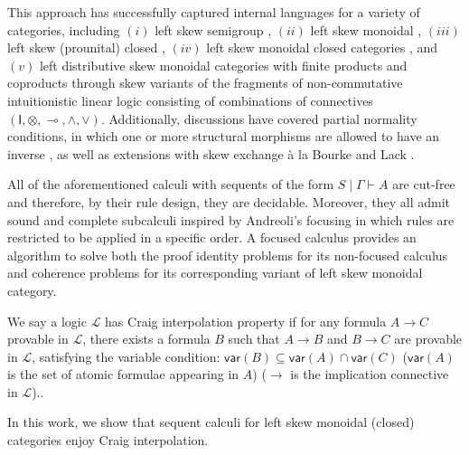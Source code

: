\documentclass[sn-mathphys-num]{sn-jnl}%
\newcommand{\GG}{\Gamma}
\newcommand{\GT}{\Theta}
\newcommand{\vd}{\vdash}
\newcommand{\ot}{\otimes}
\newcommand{\lolli}{\multimap}
\newcommand{\I}{\mathsf{I}}
\newcommand{\mc}[1]{\mathcal{#1}}
\newcommand{\vars}[1]{\mathsf{var}(#1)}
\theoremstyle{thmstyleone}%
\theoremstyle{thmstyletwo}%
\theoremstyle{thmstylethree}%
\begin{document}
This approach has successfully captured internal languages for a variety of categories, including  $(i)$ left skew semigroup \cite{zeilberger:semiassociative:19}, $(ii)$ left skew monoidal \cite{uustalu:sequent:2021}, $(iii)$ left skew (prounital) closed \cite{uustalu:deductive:nodate}, $(iv)$ left skew monoidal closed categories \cite{UVW:protsn,veltri:multifocus:23}, and $(v)$ left distributive skew monoidal categories with finite products and coproducts \cite{VW:2023} through skew variants of the fragments of non-commutative intuitionistic linear logic consisting of combinations of connectives $(\I,\ot,\lolli,\land,\lor)$.
Additionally, discussions have covered partial normality conditions, in which one or more structural morphisms are allowed to have an inverse \cite{uustalu:proof:nodate}, as well as extensions with skew exchange à la Bourke and Lack \cite{veltri:coherence:2021,VW:2023}.

All of the aforementioned calculi with sequents of the form $S \mid \GG \vd A$ are cut-free and therefore, by their rule design, they are decidable.
Moreover, they all admit sound and complete subcalculi inspired by Andreoli's focusing \cite{andreoli:logic:1992} in which
rules are restricted to be applied in a specific order.
A focused calculus provides an algorithm to solve both the proof identity problems for its non-focused calculus and coherence problems for its corresponding variant of left skew monoidal category.

We say a logic $\mc{L}$ has Craig interpolation property if for any formula $A \to C$ provable in $\mc{L}$, there exists a formula $B$ such that $A \to B$ and $B \to C$ are provable in $\mc{L}$, satisfying the variable condition: $\vars{B} \subseteq \vars{A} \cap \vars{C}$ ($\vars{A}$ is the set of atomic formulae appearing in $A$) ($\to$ is the implication connective in $\mc{L}$).\cite{craig:interpolation:1957}.

In this work, we show that sequent calculi for left skew monoidal (closed) categories enjoy Craig interpolation.

\end{document}
